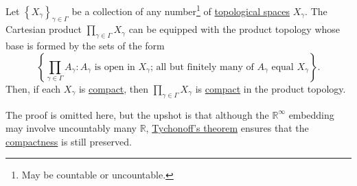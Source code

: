 \begin{theorem}\label{thm:Tychonoff}
	Let \(\left\{ X_\gamma\right\}_{\gamma \in \Gamma}\) be a collection of any number\footnote{May be countable or uncountable.} of \hyperref[def:topological-space]{topological spaces} \(X_\gamma \). The Cartesian product \(\prod_{\gamma \in \Gamma } X_\gamma \) can be equipped with the product topology whose base is formed by the sets of the form
	\[
		\left\{ \prod_{\gamma \in \Gamma } A_\gamma \colon \text{\(A_\gamma\) is open in \(X_\gamma\); all but finitely many of \(A_\gamma\) equal \(X_\gamma\)}\right\}.
	\]
	Then, if each \(X_\gamma \) is \hyperref[def:compact]{compact}, then \(\prod_{\gamma \in \Gamma }X_\gamma \) is \hyperref[def:compact]{compact} in the product topology.
\end{theorem}

The proof is omitted here, but the upshot is that although the \(\mathbb{R} ^{\infty} \) embedding may involve uncountably many \(\mathbb{R} \), \hyperref[thm:Tychonoff]{Tychonoff's theorem} ensures that the \hyperref[def:compact]{compactness} is still preserved.

